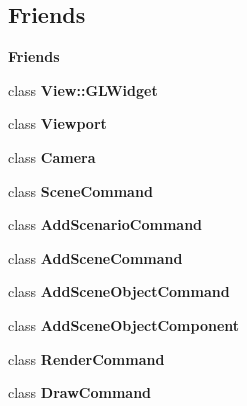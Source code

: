 \subsection*{Friends}
\begin{Indent}\textbf{ Friends}\par
\begin{DoxyCompactItemize}
\item 
\mbox{\label{classrev_1_1_main_renderer_a2c5b53aab2068e6ed47f7dce43b93fba}} 
class {\bfseries View\+::\+G\+L\+Widget}
\item 
\mbox{\label{classrev_1_1_main_renderer_ab3703ea733c8be91191d75b1546bad86}} 
class {\bfseries Viewport}
\item 
\mbox{\label{classrev_1_1_main_renderer_ad8bd9afbbd7af19d996da80e9d25890d}} 
class {\bfseries Camera}
\item 
\mbox{\label{classrev_1_1_main_renderer_a94ca2aa856479b6c0563ec946c418d7f}} 
class {\bfseries Scene\+Command}
\item 
\mbox{\label{classrev_1_1_main_renderer_abe74cfded879232919735bbff58fb58e}} 
class {\bfseries Add\+Scenario\+Command}
\item 
\mbox{\label{classrev_1_1_main_renderer_abf95af10e08e6eca38c79bb64e18c4d9}} 
class {\bfseries Add\+Scene\+Command}
\item 
\mbox{\label{classrev_1_1_main_renderer_a6dfbfaa4d50dc35d9c9491fd2b09ce23}} 
class {\bfseries Add\+Scene\+Object\+Command}
\item 
\mbox{\label{classrev_1_1_main_renderer_ad2182a3292f6d37a1a8f7cc5b6fa7dae}} 
class {\bfseries Add\+Scene\+Object\+Component}
\item 
\mbox{\label{classrev_1_1_main_renderer_a4f632c0d342d5f5809141db93d2b847b}} 
class {\bfseries Render\+Command}
\item 
\mbox{\label{classrev_1_1_main_renderer_a8055ca5f54bb0d155837882d42454e9d}} 
class {\bfseries Draw\+Command}
\end{DoxyCompactItemize}
\end{Indent}
